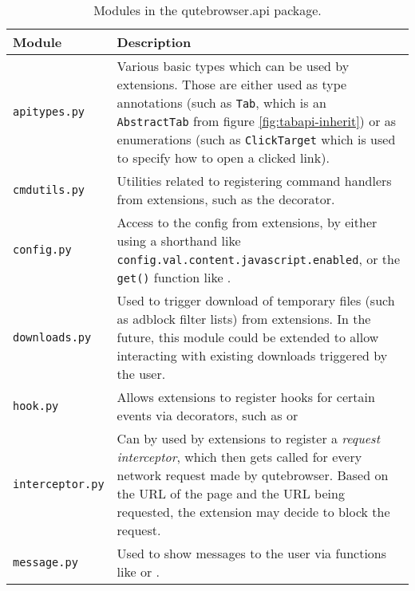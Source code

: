 \begin{table}[H]
  \centering
  \begin{tabulary}{\linewidth}{lL}
    \toprule
    Module & Description \\
    \midrule
    \verb|apitypes.py| & Various basic types which can be used by extensions.
                         Those are either used as type annotations (such as
                         \verb|Tab|, which is an \verb|AbstractTab| from figure
                         \ref{fig:tabapi-inherit}) or as enumerations (such as
                         \verb|ClickTarget| which is used to specify how to open
                         a clicked link). \\
    \verb|cmdutils.py| & Utilities related to registering command handlers from
                         extensions, such as the 
                         decorator. \\
    \verb|config.py| & Access to the config from extensions, by either using a
                       shorthand like
                       \verb|config.val.content.javascript.enabled|, or the
                       \verb|get()| function like
                       . \\
    \verb|downloads.py| & Used to trigger download of temporary files (such as
                          adblock filter lists) from extensions. In the future,
                          this module could be extended to allow interacting
                          with existing downloads triggered by the user. \\
    \verb|hook.py| & Allows extensions to register hooks for certain events via
                     decorators, such as  or
                      \\
    \verb|interceptor.py| & Can by used by extensions to register a
                            \emph{request interceptor}, which then gets called
                            for every network request made by qutebrowser. Based
                            on the URL of the page and the URL being requested,
                            the extension may decide to block the request. \\
    \verb|message.py| & Used to show messages to the user via functions like
                         or . \\
    \bottomrule
  \end{tabulary}
  \caption{Modules in the qutebrowser.api package.}
  \label{tab:apimodule}
\end{table}

